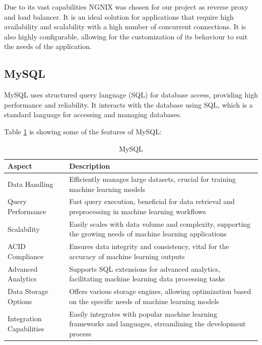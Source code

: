 Due to its vast capabilities NGNIX was chosen for our project as reverse proxy and load balancer. It is an ideal solution for applications that require high availability and scalability with a 
high number of concurrent connections. It is also highly configurable, allowing for the customization of its behaviour to suit the needs of the application.

\subsection{MySQL}
MySQL uses structured query language (SQL) for database access, providing high performance and reliability. It interacts with the database using SQL, which
is a standard language for accessing and managing databases. 


Table \ref{tab:mysql} is showing some of the features of MySQL\cite{mysql}:

\begin{table}[H]
    \centering
    \begin{tabularx}{\textwidth}{|l|X|}
        \hline
        \textbf{Aspect}          & \textbf{Description}                                                                                                   \\
        \hline
        Data Handling            & Efficiently manages large datasets, crucial for training machine learning models                                       \\
        \hline
        Query Performance        & Fast query execution, beneficial for data retrieval and preprocessing in machine learning workflows                    \\
        \hline
        Scalability              & Easily scales with data volume and complexity, supporting the growing needs of machine learning applications           \\
        \hline
        ACID Compliance          & Ensures data integrity and consistency, vital for the accuracy of machine learning outputs                             \\
        \hline
        Advanced Analytics       & Supports SQL extensions for advanced analytics, facilitating machine learning data processing tasks                    \\
        \hline
        Data Storage Options     & Offers various storage engines, allowing optimization based on the specific needs of machine learning models           \\
        \hline
        Integration Capabilities & Easily integrates with popular machine learning frameworks and languages, streamlining the development process         \\
        \hline
    \end{tabularx}
    \label{tab:mysql}
    \caption{MySQL}
\end{table}

